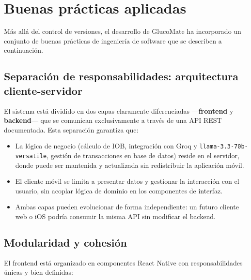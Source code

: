 \section{Buenas prácticas aplicadas}
\label{sec:buenas-practicas}

Más allá del control de versiones, el desarrollo de GlucoMate ha incorporado un conjunto
de buenas prácticas de ingeniería de software que se describen a continuación.

\subsection{Separación de responsabilidades: arquitectura cliente-servidor}
\label{subsec:separacion-responsabilidades}

El sistema está dividido en dos capas claramente diferenciadas —\textbf{frontend} y
\textbf{backend}— que se comunican exclusivamente a través de una API REST documentada.
Esta separación garantiza que:

\begin{itemize}
    \item La lógica de negocio (cálculo de IOB, integración con Groq y
          \texttt{llama-3.3-70b-versatile}, gestión de transacciones en base de datos)
          reside en el servidor, donde puede ser
          mantenida y actualizada sin redistribuir la aplicación móvil.
    \item El cliente móvil se limita a presentar datos y gestionar la interacción con el
          usuario, sin acoplar lógica de dominio en los componentes de interfaz.
    \item Ambas capas pueden evolucionar de forma independiente: un futuro cliente web
          o iOS podría consumir la misma API sin modificar el backend.
\end{itemize}

\subsection{Modularidad y cohesión}
\label{subsec:modularidad}

El frontend está organizado en componentes React Native con responsabilidades únicas y
bien definidas:

